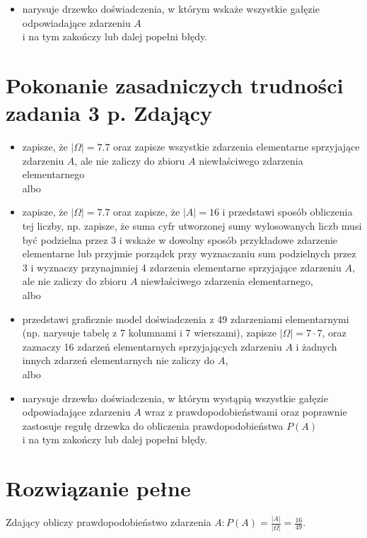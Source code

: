 \documentclass[10pt]{article}
\begin{document}
\begin{itemize}
  \item narysuje drzewko doświadczenia, w którym wskaże wszystkie gałęzie odpowiadające zdarzeniu $A$\\
i na tym zakończy lub dalej popełni błędy.
\end{itemize}

\section*{Pokonanie zasadniczych trudności zadania 3 p. Zdający}
\begin{itemize}
  \item zapisze, że $|\Omega|=7.7$ oraz zapisze wszystkie zdarzenia elementarne sprzyjające zdarzeniu $A$, ale nie zaliczy do zbioru $A$ niewłaściwego zdarzenia elementarnego\\
albo
  \item zapisze, że $|\Omega|=7.7$ oraz zapisze, że $|A|=16$ i przedstawi sposób obliczenia tej liczby, np. zapisze, że suma cyfr utworzonej sumy wylosowanych liczb musi być podzielna przez 3 i wskaże w dowolny sposób przykładowe zdarzenie elementarne lub przyjmie porządek przy wyznaczaniu sum podzielnych przez 3 i wyznaczy przynajmniej 4 zdarzenia elementarne sprzyjające zdarzeniu $A$, ale nie zaliczy do zbioru $A$ niewłaściwego zdarzenia elementarnego,\\
albo
  \item przedstawi graficznie model doświadczenia z 49 zdarzeniami elementarnymi (np. narysuje tabelę z 7 kolumnami i 7 wierszami), zapisze $|\Omega|=7 \cdot 7$, oraz zaznaczy 16 zdarzeń elementarnych sprzyjających zdarzeniu $A$ i żadnych innych zdarzeń elementarnych nie zaliczy do $A$,\\
albo
  \item narysuje drzewko doświadczenia, w którym wystąpią wszystkie gałęzie odpowiadające zdarzeniu $A$ wraz z prawdopodobieństwami oraz poprawnie zastosuje regułę drzewka do obliczenia prawdopodobieństwa $P(A)$\\
i na tym zakończy lub dalej popełni błędy.
\end{itemize}

\section*{Rozwiązanie pełne}
Zdający obliczy prawdopodobieństwo zdarzenia $A: P(A)=\frac{|A|}{|\Omega|}=\frac{16}{49}$.
\end{document}

